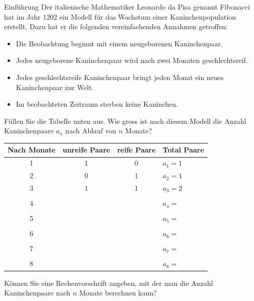 \begin{LA} {Einführung}{}
    Der italienische Mathematiker Leonardo da Pisa genannt Fibonacci
    hat im Jahr 1202 ein Modell für das Wachstum einer Kaninchenpopulation erstellt.
    Dazu hat er die folgenden vereinfachenden Annahmen getroffen:
    \begin{itemize}
        \item Die Beobachtung beginnt mit einem neugeborenen Kaninchenpaar.
        \item Jedes neugeborene Kaninchenpaar wird nach zwei Monaten geschlechtsreif.
        \item Jedes geschlechtsreife Kaninchenpaar bringt jeden Monat ein neues Kaninchenpaar zur Welt.
        \item Im beobachteten Zeitraum sterben keine Kaninchen.
    \end{itemize}
    Füllen Sie die Tabelle unten aus.
    Wie gross ist nach diesem Modell die Anzahl Kaninchenpaare $a_n$ nach Ablauf von $n$ Monate?
    
    \begin{center}
        \begin{tabular}{c|c|c|l}
            Nach Monate& unreife Paare  & reife Paare &  Total Paare  \\ \hline
            1& 1 & 0 &  $a_1 = 1$  \\
            2& 0 & 1 &  $a_2 = 1$  \\
            3& 1 & 1 &  $a_3 = 2$  \\ &&&\\
            4&  &  &  $a_4 = $  \\ &&&\\
            5&  &  &  $a_5 =  $  \\ &&&\\
            6&  &  &  $a_6 =  $  \\ &&&\\
            7&  &  &  $a_7 =  $  \\ &&&\\
            8&  &  &  $a_8 =  $  \\
        \end{tabular} 
    \end{center}
 
        Können Sie eine Rechenvorschrift angeben, mit der man die Anzahl Kaninchenpaare nach $n$ Monate berechnen kann?
\end{LA}
